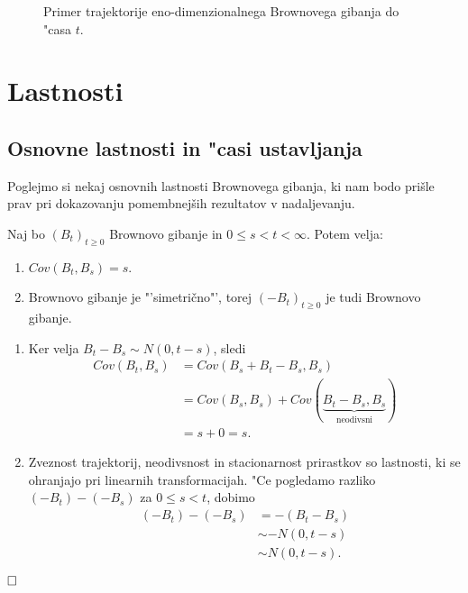 \documentclass[twoside,11pt]{article}
\begin{document}
\begin{figure}[h]
    \centering
    \caption{Primer trajektorije eno-dimenzionalnega Brownovega gibanja do "casa $t$.}
    \label{fig:slika2}
\end{figure}

\section{Lastnosti}

\subsection{Osnovne lastnosti in "casi ustavljanja}

Poglejmo si nekaj osnovnih lastnosti Brownovega gibanja, ki nam bodo prišle prav pri dokazovanju pomembnejših rezultatov v nadaljevanju.

\begin{trditev}
    Naj bo $(B_t)_{t\geq 0}$ Brownovo gibanje in $0 \leq s < t < \infty$. Potem velja:
    \begin{enumerate}
        \item $ Cov(B_t, B_s) = s$.
        \item Brownovo gibanje je "'simetrično"', torej $(-B_{t})_{t\geq0}$ je tudi Brownovo gibanje.	
    \end{enumerate}
\end{trditev}

\begin{dokaz}
    \begin{enumerate}
        \item Ker velja $B_t - B_s \sim N(0, t-s)$, sledi
        \begin{align*}
            Cov(B_t, B_s) &= Cov(B_s + B_t - B_s, B_s) \\
                        &= Cov(B_s, B_s) + Cov(\underbrace{B_t - B_s, B_s}_{\text{neodivsni}}) \\
                        &= s + 0 = s.
        \end{align*}
        \item Zveznost trajektorij, neodivsnost in stacionarnost prirastkov so lastnosti, ki se ohranjajo pri linearnih transformacijah. "Ce pogledamo razliko $(-B_t) - (-B_s)$ 
        za $0 \leq s < t$, dobimo 
        \begin{align*}
        (-B_t) - (-B_s) &= -(B_t - B_s)\\
                        &\sim -N(0, t - s)\\
                        &\sim N(0, t-s).
        \end{align*}
    \end{enumerate}
    $\hfill \square$
\end{dokaz}
\end{document}
